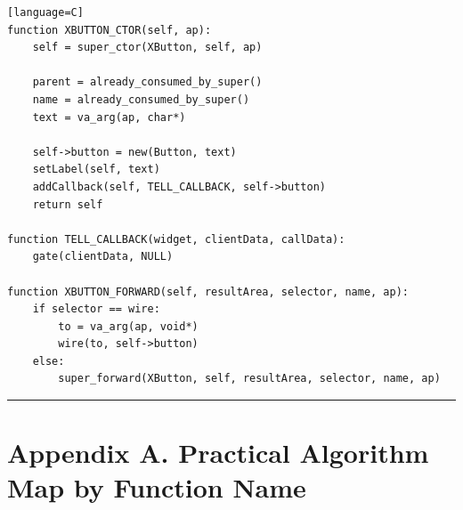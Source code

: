 \documentclass[11pt]{article}
\begin{document}
\begin{verbatim}[language=C]
function XBUTTON_CTOR(self, ap):
    self = super_ctor(XButton, self, ap)

    parent = already_consumed_by_super()
    name = already_consumed_by_super()
    text = va_arg(ap, char*)

    self->button = new(Button, text)
    setLabel(self, text)
    addCallback(self, TELL_CALLBACK, self->button)
    return self

function TELL_CALLBACK(widget, clientData, callData):
    gate(clientData, NULL)

function XBUTTON_FORWARD(self, resultArea, selector, name, ap):
    if selector == wire:
        to = va_arg(ap, void*)
        wire(to, self->button)
    else:
        super_forward(XButton, self, resultArea, selector, name, ap)
\end{verbatim}

\begin{center}\rule{0.5\linewidth}{0.5pt}\end{center}

\section{Appendix A. Practical Algorithm Map by Function
Name}\label{appendix-a.-practical-algorithm-map-by-function-name}
\end{document}
